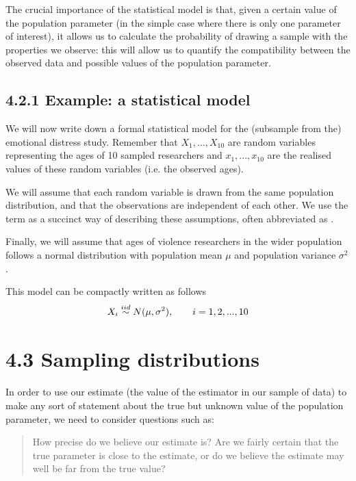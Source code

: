 \documentclass[letterpaper,10pt,english]{jupyterBook}
\begin{document}
\sphinxAtStartPar
The crucial importance of the statistical model is that, given a certain value of the population parameter (in the simple case where there is only one parameter of interest), it allows us to calculate the probability of drawing a sample with the properties we observe: this will allow us to quantify the compatibility between the observed data and possible values of the population parameter.


\subsection{4.2.1 Example: a statistical model}
\label{\detokenize{04.c. Population.and.samples:example-a-statistical-model}}
\sphinxAtStartPar
We will now write down a formal statistical model for the (sub\sphinxhyphen{}sample from the) emotional distress study. Remember that \(X_1, ...,X_{10}\) are random variables representing the ages of 10 sampled researchers and \(x_1, ..., x_{10}\) are the realised values of these random variables (i.e. the observed ages).

\sphinxAtStartPar
We will assume that each random variable is drawn from the same population distribution, and that the observations are independent of each other. We use the term  as a succinct way of describing these assumptions, often abbreviated as .

\sphinxAtStartPar
Finally, we will assume that ages of violence researchers in the wider population follows a normal distribution with population mean \(\mu\) and population variance \(\sigma^2\).

\sphinxAtStartPar
This model can be compactly written as follows
\begin{equation*}
\begin{split} 
X_i \overset{\small{iid}}{\sim} N(\mu, \sigma^2), \qquad i=1,2,...,10
\end{split}
\end{equation*}

\section{4.3 Sampling distributions}
\label{\detokenize{04.d. Population.and.samples:sampling-distributions}}\label{\detokenize{04.d. Population.and.samples::doc}}
\sphinxAtStartPar
In order to use our estimate (the value of the estimator in our sample of data) to make any sort of statement about the true but unknown value of the population parameter, we need to consider questions such as:
\begin{quote}

\sphinxAtStartPar
How precise do we believe our estimate is?
 Are we fairly certain that the true parameter is close to the estimate, or do we believe the estimate may well be far from the true value?
\end{quote}
\end{document}
